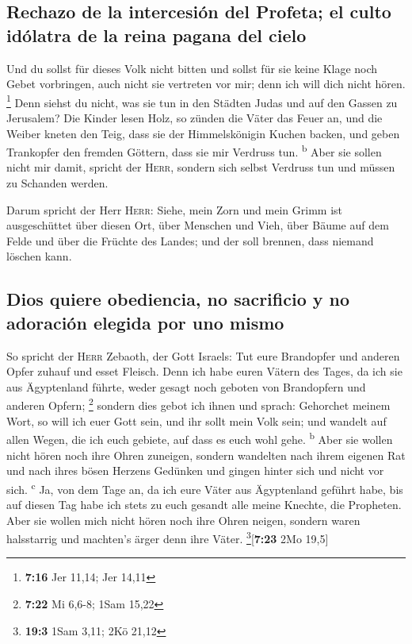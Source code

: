 \hypertarget{rechazo-de-la-intercesiuxf3n-del-profeta-el-culto-iduxf3latra-de-la-reina-pagana-del-cielo}{%
\subsection{Rechazo de la intercesión del Profeta; el culto idólatra de
la reina pagana del
cielo}\label{rechazo-de-la-intercesiuxf3n-del-profeta-el-culto-iduxf3latra-de-la-reina-pagana-del-cielo}}

 Und du sollst für dieses Volk nicht bitten und sollst
für sie keine Klage noch Gebet vorbringen, auch nicht sie vertreten vor
mir; denn ich will dich nicht hören. \footnote{\textbf{7:16} Jer 11,14;
  Jer 14,11}  Denn siehst du nicht, was sie tun in den
Städten Judas und auf den Gassen zu Jerusalem?  Die
Kinder lesen Holz, so zünden die Väter das Feuer an, und die Weiber
kneten den Teig, dass sie der Himmelskönigin Kuchen backen, und geben
Trankopfer den fremden Göttern, dass sie mir Verdruss tun.
\textsuperscript{b}  Aber sie sollen nicht mir damit,
spricht der \textsc{Herr}, sondern sich selbst Verdruss tun und müssen
zu Schanden werden.

 Darum spricht der Herr \textsc{Herr}: Siehe, mein Zorn
und mein Grimm ist ausgeschüttet über diesen Ort, über Menschen und
Vieh, über Bäume auf dem Felde und über die Früchte des Landes; und der
soll brennen, dass niemand löschen kann.

\hypertarget{dios-quiere-obediencia-no-sacrificio-y-no-adoraciuxf3n-elegida-por-uno-mismo}{%
\subsection{Dios quiere obediencia, no sacrificio y no adoración elegida
por uno
mismo}\label{dios-quiere-obediencia-no-sacrificio-y-no-adoraciuxf3n-elegida-por-uno-mismo}}

 So spricht der \textsc{Herr} Zebaoth, der Gott Israels:
Tut eure Brandopfer und anderen Opfer zuhauf und esset Fleisch.
 Denn ich habe euren Vätern des Tages, da ich sie aus
Ägyptenland führte, weder gesagt noch geboten von Brandopfern und
anderen Opfern; \footnote{\textbf{7:22} Mi 6,6-8; 1Sam 15,22}
 sondern dies gebot ich ihnen und sprach: Gehorchet
meinem Wort, so will ich euer Gott sein, und ihr sollt mein Volk sein;
und wandelt auf allen Wegen, die ich euch gebiete, auf dass es euch wohl
gehe. \textsuperscript{b}  Aber sie wollen nicht hören
noch ihre Ohren zuneigen, sondern wandelten nach ihrem eigenen Rat und
nach ihres bösen Herzens Gedünken und gingen hinter sich und nicht vor
sich. \textsuperscript{c}  Ja, von dem Tage an, da ich
eure Väter aus Ägyptenland geführt habe, bis auf diesen Tag habe ich
stets zu euch gesandt alle meine Knechte, die Propheten. 
Aber sie wollen mich nicht hören noch ihre Ohren neigen, sondern waren
halsstarrig und machten's ärger denn ihre Väter.
\footnote{\textbf{19:3} 1Sam 3,11; 2Kö 21,12}{[}\textbf{7:23} 2Mo
19,5{]}

